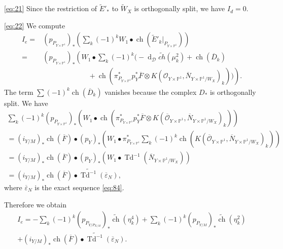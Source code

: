 \documentclass[10pt,twoside]{article}
\numberwithin{equation}{section}
\theoremstyle{plain}
\theoremstyle{definition}
\DeclareMathOperator{\Td}{Td}
\DeclareMathOperator{\dd}{d}
\DeclareMathOperator{\ch}{ch}
\begin{document}
\eqref{eq:21} Since the restriction of $\widetilde E'_{\ast}$ to
$\widetilde W_{X}$ is orthogonally split, we have $I_{d}=0$.

\eqref{eq:22} We compute
\begin{align*}
  I_{e}=&  (p_{P_{Y\times \mathbb{P}^{1}}})_{\ast}\left(\sum_{k}(-1)^{k}
    W_{1} \bullet \ch(\widetilde E'_{k}|_{P_{Y\times \mathbb{P}^{1}}})\right)\\
  =&(p_{P_{Y\times \mathbb{P}^{1}}})_{\ast}\left(W_{1} \bullet
    \sum_{k}(-1)^{k}\big( 
    -\dd_{\mathcal{D}} \widetilde {ch}(\mu
    ^{2}_{k})+\ch(\overline D_{k})\right.\\ 
  &\left.\phantom{(p_{P_{Y\times \mathbb{P}^{1}}})_{\ast}\sum_{k}}
  +\ch(\pi^{\ast}  _{P_{Y\times
        \mathbb{P}^{1}}} p^{\ast}_{Y}\overline  F\otimes
    K(\mathcal{O}_{Y\times \mathbb{P}^{1}},\overline N_{Y\times
      \mathbb{P}^{1}/W_{X}})_{k})
    \big)\right).
\end{align*}
The term $\sum(-1)^{k}\ch(\overline D_{k}) $ vanishes because the complex
$D_{\ast}$ is orthogonally split. We have
\begin{multline}
  \sum_{k}(-1)^{k}(p_{P_{Y\times \mathbb{P}^{1}}})_{\ast}(W_{1}
  \bullet \ch(\pi^{\ast}  _{P_{Y\times 
      \mathbb{P}^{1}}} p^{\ast}_{Y}\overline  F\otimes
    K(\overline {\mathcal{O}}_{Y\times \mathbb{P}^{1}},\overline N_{Y\times
      \mathbb{P}^{1}/W_{X}})_{k}))\\
    =(i_{Y/M})_{\ast}\ch(\overline F)\bullet
    (p_{Y})_{\ast}\left(W_{1}\bullet\pi ^{\ast}_{P_{Y\times \mathbb{P}^{1}}}
      \sum_{k}(-1)^{k}\ch(K(\overline {\mathcal{O}}_{Y\times
        \mathbb{P}^{1}},\overline N_{Y\times \mathbb{P}^{1}/W_{X}})_{k})
    \right)\\
    = (i_{Y/M})_{\ast}\ch(\overline F)\bullet
    (p_{Y})_{\ast}\left(W_{1}\bullet \Td^{-1}(\overline N_{Y\times \mathbb{P}^{1}/W_{X}})
    \right)\\
    = (i_{Y/M})_{\ast}\ch(\overline F)\bullet\widetilde
    {\Td^{-1}}(\overline {\varepsilon }_{N}),
\end{multline}
where $\overline{\varepsilon}_{N} $ is the exact sequence \eqref{eq:84}.

Therefore we obtain
\begin{multline*}
  I_{e}=-\sum_{k}(-1)^{k}(p_{P_{Y/P_{X/M}}})_{\ast}\widetilde {\ch}(\eta_{k}^{4})+
  \sum_{k}(-1)^{k}(p_{P_{Y/M}})_{\ast}\widetilde {\ch}(\eta_{k}^{2})\\
  +(i_{Y/M})_{\ast}\ch(\overline F)\bullet\widetilde
    {\Td^{-1}}(\overline {\varepsilon }_{N}).
\end{multline*}
\end{document}
